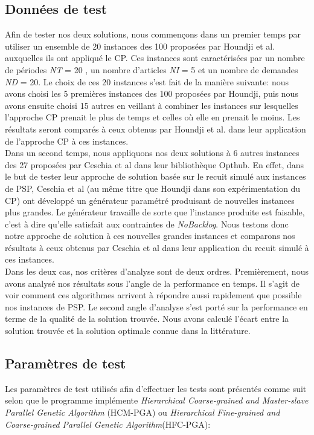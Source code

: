 	\subsection*{Données de test}
Afin de tester nos deux solutions, nous commençons dans un premier temps par utiliser un ensemble de 20 instances des 100 proposées par Houndji et al. \cite{houndji_thesis} auxquelles ils ont appliqué le CP. Ces instances sont caractérisées par un nombre de périodes \emph{NT} = 20 , un nombre d'articles \emph{NI} = 5 et un nombre de demandes \emph{ND} = 20. Le choix de ces 20 instances s'est fait de la manière suivante: nous avons choisi les 5 premières instances des 100 proposées par Houndji, puis nous avons ensuite choisi 15 autres en veillant à combiner les instances sur lesquelles l'approche CP prenait le plus de temps et celles où elle en prenait le moins. Les résultats seront comparés à ceux obtenus par Houndji et al. dans leur application de l'approche CP à ces instances. \\
		\hspace*{.5cm} Dans un second temps, nous appliquons nos deux solutions à 6 autres instances des 27 proposées par Ceschia et al \cite{ceschia} dans leur bibliothèque Opthub. En effet, dans le but de tester leur approche de solution basée sur le recuit simulé aux instances de PSP, Ceschia et al (au même titre que Houndji dans son expérimentation du CP) ont  développé un générateur paramétré produisant de nouvelles instances plus grandes. Le générateur travaille de sorte que l'instance produite est faisable, c'est à dire qu'elle satisfait aux contraintes de \emph{NoBacklog}. Nous testons donc notre approche de solution à ces nouvelles grandes instances et comparons nos résultats à ceux obtenus par Ceschia et al dans leur application du recuit simulé à ces instances. \\
		\hspace*{.5cm} Dans les deux cas, nos critères d'analyse sont de deux ordres. Premièrement, nous avons analysé nos résultats sous l'angle de la performance en temps. Il s'agit de voir comment ces algorithmes arrivent à répondre aussi rapidement que possible nos instances de PSP.  Le second angle d'analyse s'est porté sur la performance en terme de la qualité de la solution trouvée. Nous avons calculé l'écart entre la solution trouvée et la solution optimale connue dans la littérature.
		
		\subsection*{Paramètres de test}
		Les paramètres de test utilisés afin d'effectuer les tests sont présentés comme suit selon que le programme implémente \emph{Hierarchical Coarse-grained and Master-slave Parallel Genetic Algorithm} (HCM-PGA) ou \emph{Hierarchical Fine-grained and Coarse-grained Parallel Genetic Algorithm}(HFC-PGA):

